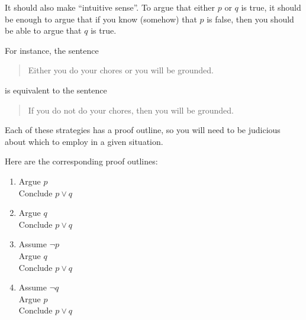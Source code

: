 \documentclass{article}
\begin{document}
It should also make ``intuitive sense''.  To argue that either $p$ or $q$ is true, it should be enough to argue that if you know (somehow) that $p$ is false, then you should be able to argue that $q$ is true.

For instance, the sentence 

\begin{quote}
		Either you do your chores or you will be grounded.
	\end{quote}

is equivalent to the sentence

\begin{quote}
		If you do not do your chores, then you will be grounded.
	\end{quote}

Each of these strategies has a proof outline, so you will need to be judicious about which to employ in a given situation.

Here are the corresponding proof outlines:

\begin{enumerate}
		\item
	
	\begin{fitch*}
		\textrm{Argue $p$}\\
		\textrm{Conclude $p \vee q$}
	\end{fitch*}
		\item
	
	\begin{fitch*}
		\textrm{Argue  $q$}\\
		\textrm{Conclude $p \vee q$}
	\end{fitch*}
	\item
	
\begin{fitch*}
	\textrm{Assume $\neg p$}\\
	\fa \textrm{Argue $q$}\\
	\textrm{Conclude $p \vee q$}
	\end{fitch*}

	\item

\begin{fitch*}
	\textrm{Assume $\neg q$}\\
	\fa \textrm{Argue $p$}\\
	\textrm{Conclude $p \vee q$}
\end{fitch*}
\end{enumerate}

\newpage
\end{document}
